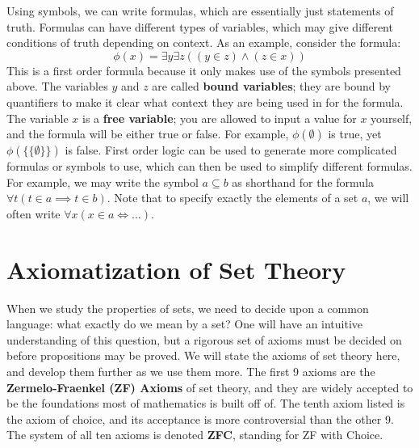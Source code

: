 \documentclass[11pt, oneside]{article}   	%
\theoremstyle{definition}
\begin{document}
Using symbols, we can write formulas, which are essentially just statements of truth. Formulas can have different types of 
variables, which may give different conditions of truth depending on context. As an example, consider the formula:
$$
	\phi(x) = \exists y\exists z ((y\in z) \wedge (z\in x))
$$
This is a first order formula because it only makes use of the symbols presented above. The variables $y$ and $z$ are called 
\textbf{bound variables}; they are bound by quantifiers to make it clear what context they are being used in for the formula. 
The variable $x$ is a \textbf{free variable}; you are allowed to input a value for $x$ yourself, and the formula will be either true 
or false. For example, $\phi(\emptyset)$ is true, yet $\phi(\{\{\emptyset\}\})$ is false. First order logic can be used to generate 
more complicated formulas or symbols to use, which can then be used to simplify different formulas. For example, we may 
write the symbol $a\subseteq b$ as shorthand for the formula $\forall t (t\in a\implies t\in b)$. Note that to specify exactly the 
elements of a set $a$, we will often write $\forall x (x\in a \iff ...)$. 

\section{Axiomatization of Set Theory}

When we study the properties of sets, we need to decide upon a common language: what exactly do we mean by a set? One 
will have an intuitive understanding of this question, but a rigorous set of axioms must be decided on before propositions may 
be proved. We will state the axioms of set theory here, and develop them further as we use them more. The first 9 axioms 
are the \textbf{Zermelo-Fraenkel (ZF) Axioms} of set theory, and they are widely accepted to be the foundations most of 
mathematics is built off of. The tenth axiom listed is the axiom of choice, and its acceptance is more controversial than the 
other 9. The system of all ten axioms is denoted \textbf{ZFC}, standing for ZF with Choice.
\end{document}
